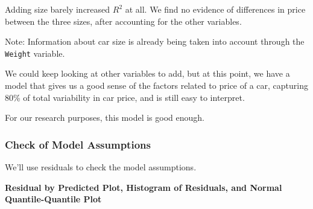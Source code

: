 \documentclass[
  letterpaper,
  DIV=11,
  numbers=noendperiod]{scrreprt}
\begin{document}
Adding size barely increased \(R^2\) at all. We find no evidence of
differences in price between the three sizes, after accounting for the
other variables.

Note: Information about car size is already being taken into account
through the \texttt{Weight} variable.

We could keep looking at other variables to add, but at this point, we
have a model that gives us a good sense of the factors related to price
of a car, capturing 80\% of total variability in car price, and is still
easy to interpret.

For our research purposes, this model is good enough.

\subsubsection{Check of Model
Assumptions}\label{check-of-model-assumptions}

We'll use residuals to check the model assumptions.

\textbf{Residual by Predicted Plot, Histogram of Residuals, and Normal
Quantile-Quantile Plot}
\end{document}

